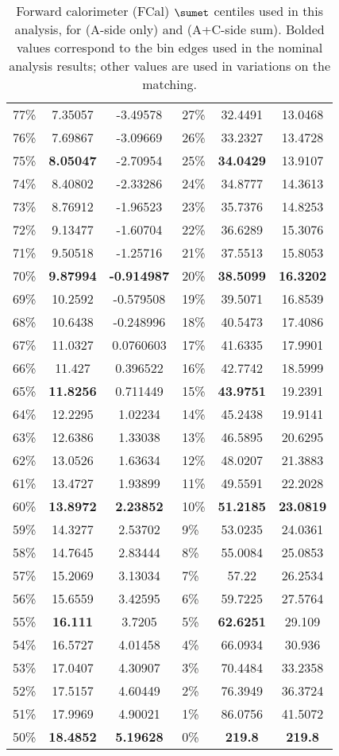 \documentclass[IntNote.tex]{subfiles}
\begin{document}
\begin{center}
\begin{table}[]
\begin{tabular}{l|c|c||l|c|c}
77\% & 7.35057 & -3.49578 & 27\% & 32.4491 & 13.0468 \\
76\% & 7.69867 & -3.09669 & 26\% & 33.2327 & 13.4728 \\
75\% & \textbf{8.05047} & -2.70954 & 25\% & \textbf{34.0429} & 13.9107 \\
74\% & 8.40802 & -2.33286 & 24\% & 34.8777 & 14.3613 \\
73\% & 8.76912 & -1.96523 & 23\% & 35.7376 & 14.8253 \\
72\% & 9.13477 & -1.60704 & 22\% & 36.6289 & 15.3076 \\
71\% & 9.50518 & -1.25716 & 21\% & 37.5513 & 15.8053 \\
70\% & \textbf{9.87994} & \textbf{-0.914987} & 20\% & \textbf{38.5099} & \textbf{16.3202} \\
69\% & 10.2592 & -0.579508 & 19\% & 39.5071 & 16.8539 \\
68\% & 10.6438 & -0.248996 & 18\% & 40.5473 & 17.4086 \\
67\% & 11.0327 & 0.0760603 & 17\% & 41.6335 & 17.9901 \\
66\% & 11.427 & 0.396522 & 16\% & 42.7742 & 18.5999 \\
65\% & \textbf{11.8256} & 0.711449 & 15\% & \textbf{43.9751} & 19.2391 \\
64\% & 12.2295 & 1.02234 & 14\% & 45.2438 & 19.9141 \\
63\% & 12.6386 & 1.33038 & 13\% & 46.5895 & 20.6295 \\
62\% & 13.0526 & 1.63634 & 12\% & 48.0207 & 21.3883 \\
61\% & 13.4727 & 1.93899 & 11\% & 49.5591 & 22.2028 \\
60\% & \textbf{13.8972} & \textbf{2.23852} & 10\% & \textbf{51.2185} & \textbf{23.0819} \\
59\% & 14.3277 & 2.53702 & 9\% & 53.0235 & 24.0361 \\
58\% & 14.7645 & 2.83444 & 8\% & 55.0084 & 25.0853 \\
57\% & 15.2069 & 3.13034 & 7\% & 57.22 & 26.2534 \\
56\% & 15.6559 & 3.42595 & 6\% & 59.7225 & 27.5764 \\
55\% & \textbf{16.111} & 3.7205 & 5\% & \textbf{62.6251} & 29.109 \\
54\% & 16.5727 & 4.01458 & 4\% & 66.0934 & 30.936 \\
53\% & 17.0407 & 4.30907 & 3\% & 70.4484 & 33.2358 \\
52\% & 17.5157 & 4.60449 & 2\% & 76.3949 & 36.3724 \\
51\% & 17.9969 & 4.90021 & 1\% & 86.0756 & 41.5072 \\
50\% & \textbf{18.4852} & \textbf{5.19628} & 0\% & \textbf{219.8} & \textbf{219.8} \\
    \end{tabular}
  \caption{Forward calorimeter (FCal) $\sumet$ centiles used in this analysis, for \pPb (A-side only) and \pp (A+C-side sum). Bolded values correspond to the bin edges used in the nominal analysis results; other values are used in variations on the matching.}
  \label{tab:fcaletbins}
\end{table}
\end{center}
\end{document}
